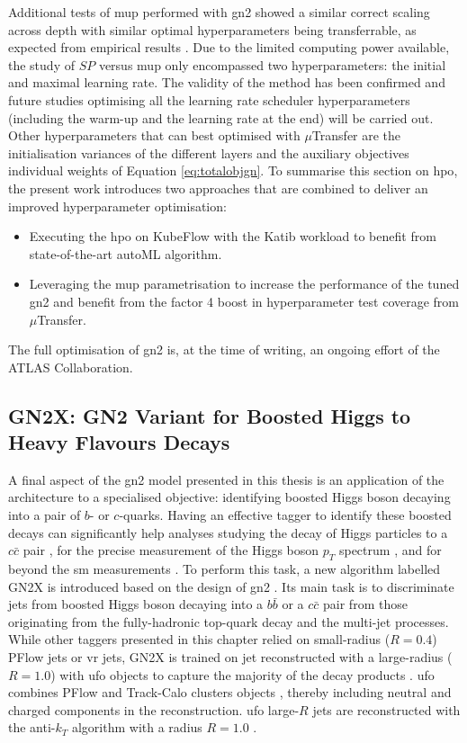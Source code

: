 Additional tests of \gls{mup} performed with \gls{gn2} showed a similar correct scaling across depth with similar optimal hyperparameters being transferrable, as expected from empirical results \cite{yang2021tuning}. Due to the limited computing power available, the study of $SP$ versus \gls{mup} only encompassed two hyperparameters: the initial and maximal learning rate. The validity of the method has been confirmed and future studies optimising all the learning rate scheduler hyperparameters (including the warm-up and the learning rate at the end) will be carried out. Other hyperparameters that can best optimised with $\mu$Transfer are the initialisation variances of the different layers and the auxiliary objectives individual weights of Equation \ref{eq:totalobjgn}. To summarise this section on \gls{hpo}, the present work introduces two approaches that are combined to deliver an improved hyperparameter optimisation:
\begin{itemize}
  \item Executing the \gls{hpo} on KubeFlow with the Katib workload to benefit from state-of-the-art autoML algorithm.
  \item Leveraging the \gls{mup} parametrisation to increase the performance of the tuned \gls{gn2} and benefit from the factor 4 boost in hyperparameter test coverage from $\mu$Transfer.
\end{itemize}
The full optimisation of \gls{gn2} is, at the time of writing, an ongoing effort of the ATLAS Collaboration.

\subsection{GN2X: GN2 Variant for Boosted Higgs to Heavy Flavours Decays}\label{chap-GN2X}
A final aspect of the \gls{gn2} model presented in this thesis is an application of the architecture to a specialised objective: identifying boosted Higgs boson decaying into a pair of $b$- or $c$-quarks. Having an effective tagger to identify these boosted decays can significantly help analyses studying the decay of Higgs particles to a $c\bar{c}$ pair \cite{ATLAS:2022ers}, for the precise measurement of the Higgs boson $p_T$ spectrum \cite{PhysRevD.105.092003}, and for beyond the \gls{sm} measurements \cite{ATLAS:2023azi}. To perform this task, a new algorithm labelled GN2X is introduced based on the design of \gls{gn2} \cite{ATL-PHYS-PUB-2023-021}. Its main task is to discriminate jets from boosted Higgs boson decaying into a $b\bar{b}$ or a $c\bar{c}$ pair from those originating from the fully-hadronic top-quark decay and the multi-jet processes. While other taggers presented in this chapter relied on small-radius ($R=0.4$) PFlow jets or \gls{vr} jets, GN2X is trained on jet reconstructed with a large-radius ($R=1.0$) with \gls{ufo} objects to capture the majority of the decay products \cite{atlasLARGERJet}. \gls{ufo} combines PFlow \cite{atlasPFLOW} and Track-Calo clusters objects \cite{ATL-PHYS-PUB-2017-015}, thereby including neutral and charged components in the reconstruction. \gls{ufo} large-$R$ jets are reconstructed with the anti-$k_T$ algorithm with a radius $R = 1.0$ \cite{Cacciari:2008gp}. \\

